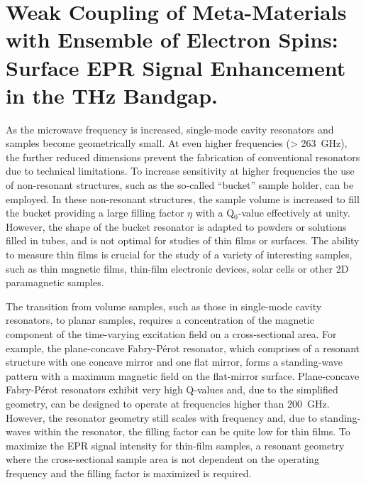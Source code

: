 \chapter[Weak Coupling of Meta-Materials for FD-FT THz EPR]{Weak Coupling of Meta-Materials with Ensemble of Electron Spins: Surface EPR Signal Enhancement in the THz Bandgap.}

As the microwave frequency is increased, single-mode cavity resonators and samples become geometrically small. At even higher frequencies (> 263~GHz), the further reduced dimensions prevent the fabrication of conventional resonators due to technical limitations. To increase sensitivity at higher frequencies the use of non-resonant structures, such as the so-called ``bucket'' sample holder, can be employed. In these non-resonant structures, the sample volume is increased to fill the bucket providing a large filling factor $\eta$ with a Q$_0$-value effectively at unity. \cite{grinbergVHF} However, the shape of the bucket resonator is adapted to powders or solutions filled in tubes, and is not optimal for studies of thin films or surfaces. The ability to measure thin films is crucial for the study of a variety of interesting samples, such as thin magnetic films, thin-film electronic devices, solar cells or other 2D paramagnetic samples.

The transition from volume samples, such as those in single-mode cavity resonators, to planar samples, requires a concentration of the magnetic component of the time-varying excitation field on a cross-sectional area. For example, the plane-concave Fabry-P\'{e}rot resonator, which comprises of a resonant structure with one concave mirror and one flat mirror, forms a standing-wave pattern with a maximum magnetic field on the flat-mirror surface. \cite{grinbergVHF} Plane-concave Fabry-P\'{e}rot resonators exhibit very high Q-values and, due to the simplified geometry, can be designed to operate at frequencies higher than 200~GHz. \cite{Clarke1982Fabry, BraakmanFabry} However, the resonator geometry still scales with frequency and, due to standing-waves within the resonator, the filling factor can be quite low for thin films. To maximize the EPR signal intensity for thin-film samples, a resonant geometry where the cross-sectional sample area is not dependent on the operating frequency and the filling factor is maximized is required. 

